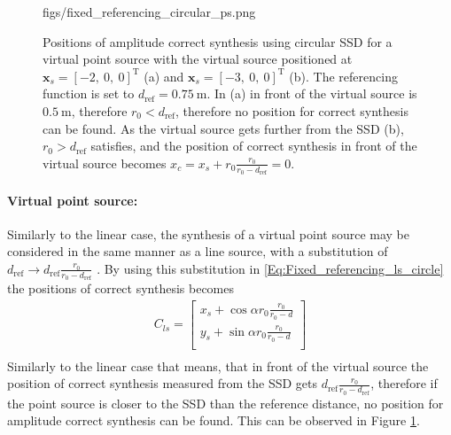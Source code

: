 \documentclass[12pt,a4paper]{article}
\newcommand{\dref}{d_{\mathrm{ref}}}
\begin{document}
\begin{figure}
	\centering
	\begin{overpic}[width = 1\columnwidth]{figs/fixed_referencing_circular_ps.png}
	\end{overpic}
\caption{ Positions of amplitude correct synthesis using circular SSD for a virtual point source with the virtual source positioned at $\mathbf{x}_s = [-2,\ 0,\ 0]^{\mathrm{T}}$ (a) and $\mathbf{x}_s = [-3,\ 0,\ 0]^{\mathrm{T}}$ (b). The referencing function is set to $\dref = 0.75~\mathrm{m}$. In (a) in front of the virtual source is $0.5~\mathrm{m}$, therefore $r_0< \dref$, therefore no position for correct synthesis can be found. As the virtual source gets further from the SSD (b), $r_0> \dref$ satisfies, and the position of correct synthesis in front of the virtual source becomes $x_c = x_s + r_0\frac{r_0}{r_0-\dref} = 0$. }
	\label{Fig:Theory:fixed_referencing_circular_ps}
\end{figure}
\paragraph{Virtual point source:\\}
Similarly to the linear case, the synthesis of a virtual point source may be considered in the same manner as a line source, with a substitution of $\dref \rightarrow \dref \frac{r_0}{r_0 - \dref}$ . By using this substitution in \eqref{Eq:Fixed_referencing_ls_circle} the positions of correct synthesis becomes
\begin{eqnarray}
C_{ls} =  \begin{bmatrix} x_s + \cos\alpha r_0 \frac{r_0}{r_0 - d}  \\[0.3em] y_s + \sin\alpha r_0 \frac{r_0}{r_0 - d} \\[0.3em]    \end{bmatrix} \\
\label{Eq:Fixed_referencing_ps_circle}
\end{eqnarray}
Similarly to the linear case that means, that in front of the virtual source the position of correct synthesis measured from the SSD gets $\dref \frac{r_0}{r_0- \dref}$, therefore if the point source is closer to the SSD than the reference distance, no position for amplitude correct synthesis can be found. This can be observed in Figure \ref{Fig:Theory:fixed_referencing_circular_ps}.
\end{document}
